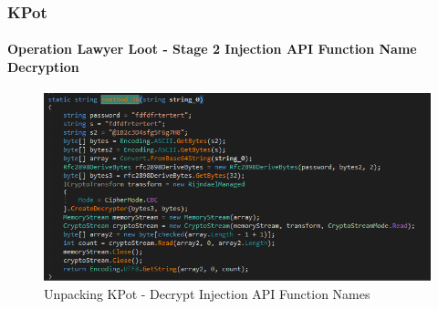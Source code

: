 \documentclass[aspectratio=169]{beamer}
\begin{document}
{
\begin{frame}
  \frametitle{KPot}
  \framesubtitle{Operation Lawyer Loot - Stage 2 Injection API Function Name Decryption}
  \begin{center}
    \begin{figure}
      \includegraphics[width=12cm]{kpot-unpacking-9}
      \caption{Unpacking KPot - Decrypt Injection API Function Names}
    \end{figure}
  \end{center}
\end{frame}
}
\end{document}
